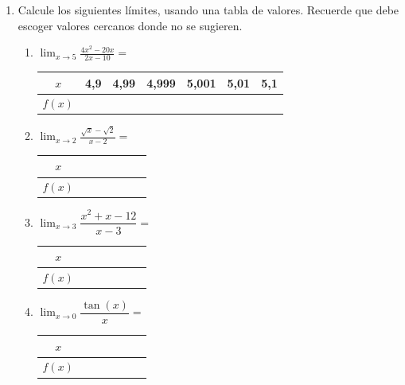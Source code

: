\documentclass[fleqn,10pt]{article}
\let\ds\displaystyle
\begin{document}
\ExamNameLine
\begin{enumerate}
   \item Calcule los siguientes límites, usando una tabla de valores. Recuerde que debe escoger valores cercanos donde no se sugieren.
      \begin{enumerate}
	 \item $\ds{\lim_{x\rightarrow5}\frac{4x^2-20x}{2x-10}}=$
\begin{center}
   \begin{tabular}{|c|p{1.2cm}|p{1.2cm}|p{1.2cm}||p{1.2cm}|p{1.2cm}|p{1.2cm}|}
\hline 
$x$ & 4,9 & 4,99 & 4,999 & 5,001 & 5,01 & 5,1  \\ 
\hline 
$f(x)$ &  &  &  &  & & \\ 
\hline 
\end{tabular} 
\end{center}	 
	 \item $\ds{\lim_{x\rightarrow2}\frac{\sqrt{x}-\sqrt{2}}{x-2}}=$
\begin{center}
   \begin{tabular}{|c|p{1.2cm}|p{1.2cm}|p{1.2cm}||p{1.2cm}|p{1.2cm}|p{1.2cm}|}
\hline 
$x$ &  &  &  &  &  &  \\ 
\hline 
$f(x)$ &  &  &  &  & & \\ 
\hline 
\end{tabular} 
\end{center}	
	\item $\ds{\lim_{x\rightarrow3}\dfrac{x^2+x-12}{x-3}}=$
	\begin{center}
   \begin{tabular}{|c|p{1.2cm}|p{1.2cm}|p{1.2cm}||p{1.2cm}|p{1.2cm}|p{1.2cm}|}
\hline 
$x$ &  &  &  &  &  &  \\ 
\hline 
$f(x)$ &  &  &  &  & & \\ 
\hline 
\end{tabular} 
\end{center}	
	\item $\ds{\lim_{x\rightarrow0}\dfrac{\tan(x)}{x}}=$
	\begin{center}
   \begin{tabular}{|c|p{1.2cm}|p{1.2cm}|p{1.2cm}||p{1.2cm}|p{1.2cm}|p{1.2cm}|}
\hline 
$x$ &  &  &  &  &  &  \\ 
\hline 
$f(x)$ &  &  &  &  & & \\ 
\hline 
\end{tabular} 

\end{center}
\end{enumerate}
\end{enumerate}
\end{document}
